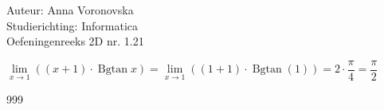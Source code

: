 \documentclass[a4paper]{article}
\begin{document}
\noindent \large Auteur: Anna Voronovska \\
\noindent \large Studierichting: Informatica \\
\noindent \large Oefeningenreeks 2D nr. 1.21 \\

\bigskip 

\normalsize

$\lim\limits_{x \to 1} \left( (x+1) \cdot \operatorname{Bgtan} x \right) =\lim\limits_{x \to 1} \left( (1+1) \cdot \operatorname{Bgtan}(1) \right) =2 \cdot \dfrac{\pi}{4}=\dfrac{\pi}{2}$



\begin{thebibliography}{999}
\end{thebibliography}
\end{document}
